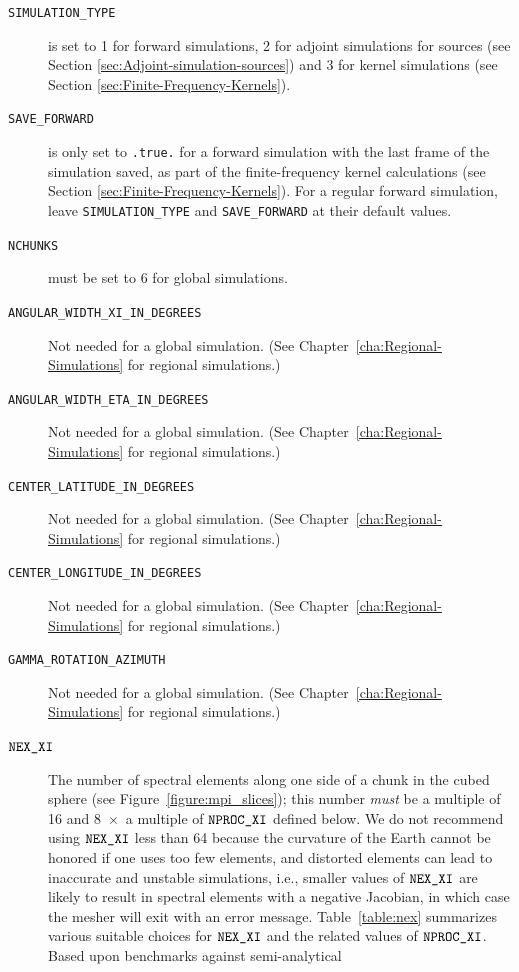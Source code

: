 \documentclass[oneside,english]{book}
\newcommand{\nexxi}{\mbox{\texttt{NEX\_XI}}}
\newcommand{\nprocxi}{\mbox{\texttt{NPROC\_XI}}}
\begin{document}
\begin{description}
\item [{\texttt{SIMULATION\_TYPE}}] is set to 1 for forward simulations,
2 for adjoint simulations for sources (see Section \ref{sec:Adjoint-simulation-sources})
and 3 for kernel simulations (see Section \ref{sec:Finite-Frequency-Kernels}).
\item [{\texttt{SAVE\_FORWARD}}] is only set to \texttt{.true.} for a forward
simulation with the last frame of the simulation saved, as part of
the finite-frequency kernel calculations (see Section \ref{sec:Finite-Frequency-Kernels}).
For a regular forward simulation, leave \texttt{SIMULATION\_TYPE}
and \texttt{SAVE\_FORWARD} at their default values.
\item [{\texttt{NCHUNKS}}] must be set to 6 for global simulations.
\item [{\texttt{ANGULAR\_WIDTH\_XI\_IN\_DEGREES}}] Not needed for a global
simulation. (See Chapter~\ref{cha:Regional-Simulations} for regional
simulations.)
\item [{\texttt{ANGULAR\_WIDTH\_ETA\_IN\_DEGREES}}] Not needed for a global
simulation. (See Chapter~\ref{cha:Regional-Simulations} for regional
simulations.)
\item [{\texttt{CENTER\_LATITUDE\_IN\_DEGREES}}] Not needed for a global
simulation. (See Chapter~\ref{cha:Regional-Simulations} for regional
simulations.)
\item [{\texttt{CENTER\_LONGITUDE\_IN\_DEGREES}}] Not needed for a global
simulation. (See Chapter~\ref{cha:Regional-Simulations} for regional
simulations.)
\item [{\texttt{GAMMA\_ROTATION\_AZIMUTH}}] Not needed for a global simulation.
(See Chapter~\ref{cha:Regional-Simulations}  for regional simulations.)
\item [{$\nexxi$}] The number of spectral elements along one side of a
chunk in the cubed sphere (see Figure~\ref{figure:mpi_slices});
this number \textit{must} be a multiple of 16 and 8~$\times$~a
multiple of $\nprocxi$ defined below. We do not recommend using $\nexxi$
less than 64 because the curvature of the Earth cannot be honored
if one uses too few elements, and distorted elements can lead to inaccurate
and unstable simulations, i.e., smaller values of $\nexxi$ are likely
to result in spectral elements with a negative Jacobian, in which
case the mesher will exit with an error message. Table~\ref{table:nex}
summarizes various suitable choices for $\nexxi$ and the related
values of $\nprocxi$. Based upon benchmarks against semi-analytical

\end{description}
\end{document}
